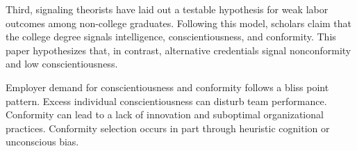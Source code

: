 Third, signaling theorists have laid out a testable hypothesis for weak labor outcomes among non-college graduates.
Following this model, scholars claim that the college degree signals intelligence, conscientiousness, and conformity\cite{caplan2018case}.
This paper hypothesizes that, in contrast, alternative credentials signal nonconformity and low conscientiousness.




Employer demand for conscientiousness and conformity follows a bliss point pattern.
Excess individual conscientiousness can disturb team performance\cite{curcseu2019personality}.
Conformity can lead to a lack of innovation and suboptimal organizational practices\cite{symon2006neglected}.
Conformity selection occurs in part through heuristic cognition or unconscious bias.


